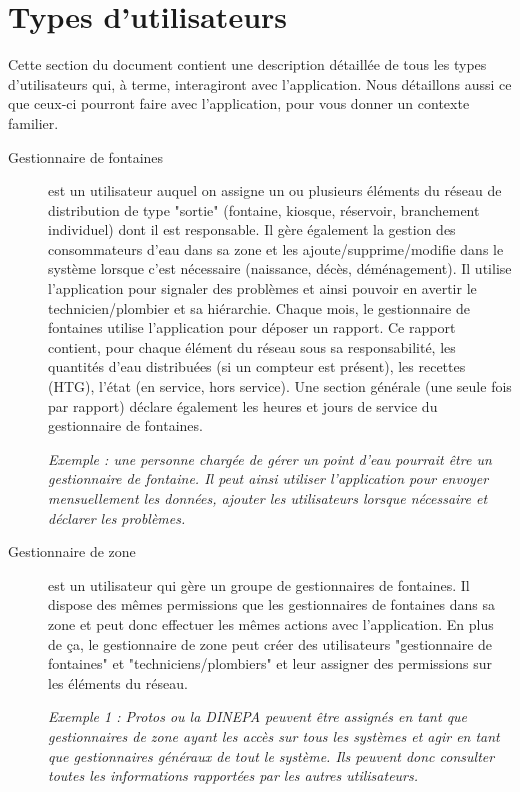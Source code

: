 \documentclass[a4paper, 11pt]{article}
\begin{document}
\section{Types d'utilisateurs}
\label{users}
Cette section du document contient une description détaillée de tous les types d'utilisateurs qui, à terme, interagiront avec l'application. Nous détaillons aussi ce que ceux-ci pourront faire avec l'application, pour vous donner un contexte familier.

  \begin{description}
    \item[Gestionnaire de fontaines] est un utilisateur auquel on assigne un ou plusieurs éléments du réseau de distribution de type "sortie" (fontaine, kiosque, réservoir, branchement individuel) dont il est responsable.
    Il gère également la gestion des consommateurs d'eau dans sa zone et les ajoute/supprime/modifie dans le système lorsque c'est nécessaire (naissance, décès, déménagement).
    Il utilise l'application pour signaler des problèmes et ainsi pouvoir en avertir le technicien/plombier et sa hiérarchie. Chaque mois, le gestionnaire de fontaines utilise l'application pour déposer un rapport. Ce rapport contient, pour chaque élément du réseau sous sa responsabilité, les quantités d'eau distribuées (si un compteur est présent), les recettes (HTG), l'état (en service, hors service). Une section générale (une seule fois par rapport) déclare également les heures et jours de service du gestionnaire de fontaines.

    \emph{Exemple : une personne chargée de gérer un point d'eau pourrait être un gestionnaire de fontaine. Il peut ainsi utiliser l'application pour envoyer mensuellement les données, ajouter les utilisateurs lorsque nécessaire et déclarer les problèmes.}

    \item[Gestionnaire de zone] est un utilisateur qui gère un groupe de gestionnaires de fontaines. Il dispose des mêmes permissions que les gestionnaires de fontaines dans sa zone et peut donc effectuer les mêmes actions avec l'application. En plus de ça, le gestionnaire de zone peut créer des utilisateurs "gestionnaire de fontaines" et  "techniciens/plombiers" et leur assigner des permissions sur les éléments du réseau. %

    \emph{Exemple 1 : Protos ou la DINEPA peuvent être assignés en tant que gestionnaires de zone ayant les accès sur tous les systèmes et agir en tant que gestionnaires généraux de tout le système. Ils peuvent donc consulter toutes les informations rapportées par les autres utilisateurs.}


\end{description}
\end{document}

